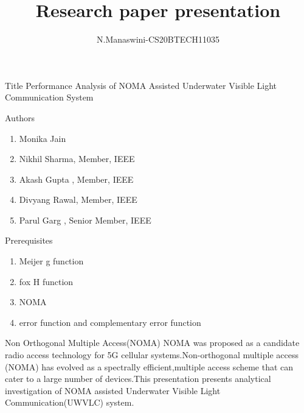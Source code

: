 \documentclass{beamer}
\title{Research paper presentation}
\author{N.Manaswini-CS20BTECH11035}
\date{}
\begin{document}
\begin{frame}
\titlepage
\end{frame}

\begin{frame}
\begin{block}{Title}
Performance Analysis of NOMA Assisted Underwater Visible
Light Communication System
\end{block}
\begin{block}{Authors}
\begin{enumerate}
\item Monika Jain
\item Nikhil Sharma, Member, IEEE
\item Akash Gupta , Member, IEEE
\item Divyang Rawal, Member, IEEE
\item Parul Garg , Senior Member, IEEE
\end{enumerate}
\end{block}
\end{frame}





\begin{frame}
\begin{block}{Prerequisites}
\begin{enumerate}
\item Meijer g function
\item fox H function
\item NOMA
\item error function and complementary error function
\end{enumerate}
\end{block}
\begin{block}{Non Orthogonal Multiple Access(NOMA)}
NOMA was proposed as a candidate radio access technology for 5G cellular systems.Non-orthogonal multiple access (NOMA) has evolved as a spectrally efficient,multiple access scheme that can cater to a large number of devices.This presentation presents analytical investigation of NOMA assisted Underwater Visible Light Communication(UWVLC) system.
\end{block}
\end{frame}
\end{document}
